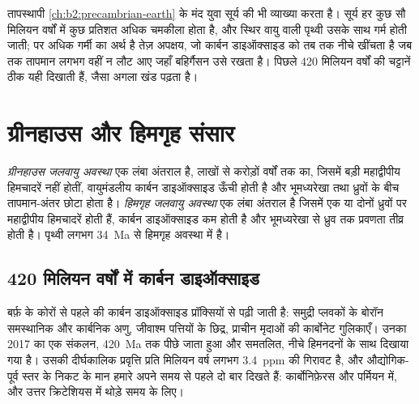 तापस्थापी \cref{ch:b2:precambrian-earth} के मंद युवा सूर्य की भी व्याख्या करता है। सूर्य हर कुछ सौ
मिलियन वर्षों में कुछ प्रतिशत अधिक चमकीला होता है, और स्थिर वायु वाली पृथ्वी उसके साथ गर्म होती जाती;
पर अधिक गर्मी का अर्थ है तेज़ अपक्षय, जो कार्बन डाइऑक्साइड को तब तक नीचे खींचता है जब तक तापमान
लगभग वहीं न लौट आए जहाँ बहिर्गैसन उसे रखता है। पिछले 420 मिलियन वर्षों की चट्टानें ठीक यही दिखाती
हैं, जैसा अगला खंड पढ़ता है।

\section{ग्रीनहाउस और हिमगृह संसार}\label{sec:b2:deep-time-climate:states}

\begin{definition}\label{def:b2:deep-time-climate:states}
\emph{ग्रीनहाउस जलवायु अवस्था} एक लंबा अंतराल है, लाखों से
करोड़ों वर्षों तक का, जिसमें बड़ी महाद्वीपीय हिमचादरें नहीं होतीं, वायुमंडलीय कार्बन डाइऑक्साइड ऊँची
होती है और भूमध्यरेखा तथा ध्रुवों के बीच तापमान-अंतर छोटा होता है। \emph{हिमगृह जलवायु
अवस्था} एक लंबा अंतराल है जिसमें एक या दोनों ध्रुवों पर महाद्वीपीय
हिमचादरें होती हैं, कार्बन डाइऑक्साइड कम होती है और भूमध्यरेखा से ध्रुव तक प्रवणता तीव्र होती है।
पृथ्वी लगभग \qty{34}{Ma} से हिमगृह अवस्था में है।
\end{definition}

\subsection*{420 मिलियन वर्षों में कार्बन डाइऑक्साइड}

बर्फ़ के कोरों से पहले की कार्बन डाइऑक्साइड प्रॉक्सियों से पढ़ी जाती है: समुद्री प्लवकों के बोरॉन
समस्थानिक और कार्बनिक अणु, जीवाश्म पत्तियों के छिद्र, प्राचीन मृदाओं की कार्बोनेट गुलिकाएँ। उनका 2017 का
एक संकलन, \qty{420}{Ma} तक पीछे जाता हुआ और समतलित, नीचे हिमनदनों के साथ दिखाया गया है। उसकी
दीर्घकालिक प्रवृत्ति प्रति मिलियन वर्ष लगभग \qty{3.4}{ppm} की गिरावट है, और औद्योगिक-पूर्व स्तर के
निकट के मान हमारे अपने समय से पहले दो बार दिखते हैं: कार्बोनिफ़ेरस और पर्मियन में, और
उत्तर क्रिटेशियस में थोड़े समय के लिए।


